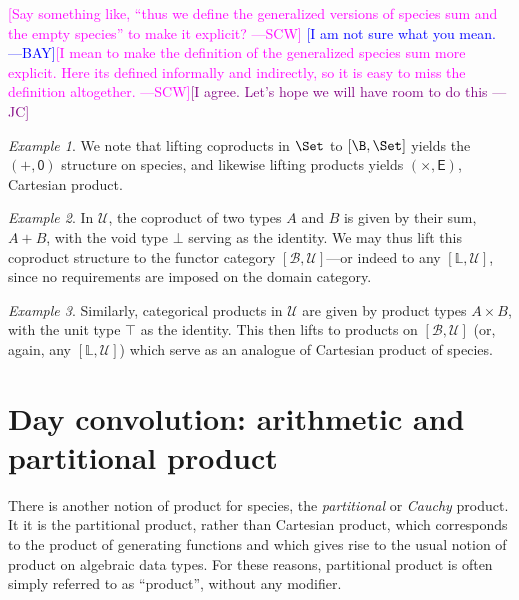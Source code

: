 \documentclass[preprint,authoryear]{sigplanconf}
\newcommand{\authornote}[3]{\textcolor{#1}{[#3 ---#2]}}
\newcommand{\authornote}[3]{}
\newcommand{\bay}[1]{\authornote{blue}{BAY}{#1}}
\newcommand{\jc}[1]{\authornote{purple}{JC}{#1}}
\newcommand{\scw}[1]{\authornote{magenta}{SCW}{#1}}
\newcommand{\term}[1]{\emph{#1}}
\newcommand{\bbb}[1]{\ensuremath{\mathbb{#1}}\xspace}
\newcommand{\mcal}[1]{\ensuremath{\mathcal{#1}}}
\newcommand{\msf}[1]{\ensuremath{\mathsf{#1}}\xspace}
\theoremstyle{definition}
\theoremstyle{remark}
\newtheorem*{ex}{Example}
\newcommand{\TyZero}{\ensuremath{\bot}\xspace}
\newcommand{\TyOne}{\ensuremath{\top}\xspace}
\newcommand{\Type}{\ensuremath{\mathcal{U}}}
\newcommand{\BT}{\mcal{B}}
\providecommand{\Sp}{}
\renewcommand{\Sp}{\msf}
\newcommand{\E}{\Sp{E}}
\newcommand{\Zero}{\msf{0}}
\newcommand{\One}{\msf{1}}
\newcommand{\Lab}{\bbb{L}}
\begin{document}
\scw{Say something like, ``thus we define the generalized versions of species
  sum and the empty species'' to make it explicit?} \bay{I am not sure
  what you mean.}\scw{I mean to make the definition of the generalized
  species sum more explicit. Here its defined informally and indirectly, so it
  is easy to miss the definition altogether.}\jc{I agree.  Let's hope we will
  have room to do this}

\begin{ex}
  We note that lifting coproducts in $\Set$ to $[\B,\Set]$ yields the $(+,
  \Zero)$ structure on species, and likewise lifting products yields $(\times,
  \E)$, Cartesian product.
\end{ex}

\begin{ex}
  In $\Type$, the coproduct of two types $A$ and $B$ is given by their
  sum, $A + B$, with the void type $\TyZero$ serving as the identity.
  We may thus lift this coproduct structure to the functor category
  $[\BT, \Type]$---or indeed to any $[\Lab, \Type]$, since no
  requirements are imposed on the domain category.
\end{ex}

\begin{ex}
  Similarly, categorical products in $\Type$ are given by product
  types $A \times B$, with the unit type $\TyOne$ as the identity.
  This then lifts to products on $[\BT,\Type]$ (or, again, any
  $[\Lab,\Type]$) which serve as an analogue of Cartesian product of
  species.
\end{ex}

\section{Day convolution: arithmetic and partitional product}
\label{sec:Day-convolution}

There is another notion of product for species, the \term{partitional}
or \term{Cauchy} product.  It it is the partitional product, rather
than Cartesian product, which corresponds to the product of generating
functions and which gives rise to the usual notion of product on
algebraic data types.  For these reasons, partitional product is often
simply referred to as ``product'', without any modifier.
\end{document}
